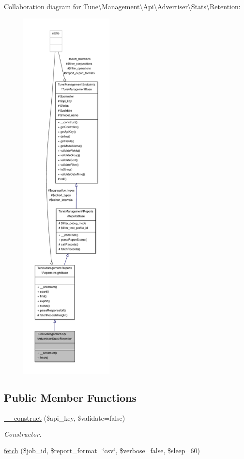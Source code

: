 Collaboration diagram for Tune\textbackslash{}Management\textbackslash{}Api\textbackslash{}Advertiser\textbackslash{}Stats\textbackslash{}Retention\-:
\nopagebreak
\begin{figure}[H]
\begin{center}
\leavevmode
\includegraphics[height=550pt]{classTune_1_1Management_1_1Api_1_1Advertiser_1_1Stats_1_1Retention__coll__graph}
\end{center}
\end{figure}
\subsection*{Public Member Functions}
\begin{DoxyCompactItemize}
\item 
\hyperlink{classTune_1_1Management_1_1Api_1_1Advertiser_1_1Stats_1_1Retention_ab488cc15c54110adc216f8f2693de629}{\-\_\-\-\_\-construct} (\$api\-\_\-key, \$validate=false)
\begin{DoxyCompactList}\small\item\em Constructor. \end{DoxyCompactList}\item 
\hyperlink{classTune_1_1Management_1_1Api_1_1Advertiser_1_1Stats_1_1Retention_a3e3d814f72c6661100142c6b88ff320b}{fetch} (\$job\-\_\-id, \$report\-\_\-format=\char`\"{}csv\char`\"{}, \$verbose=false, \$sleep=60)
\end{DoxyCompactItemize}
